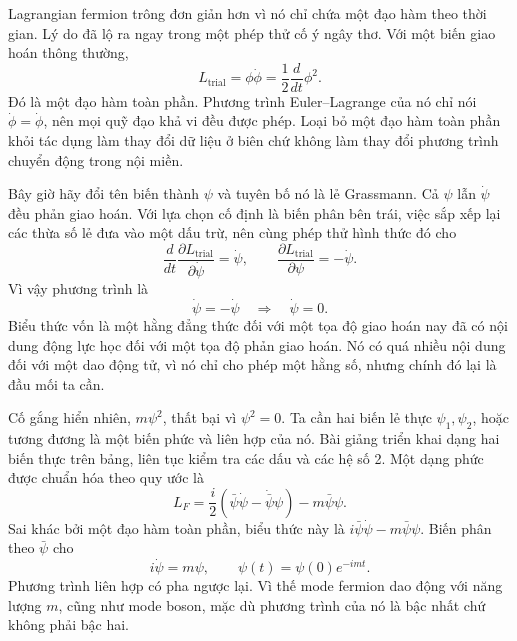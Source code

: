 Lagrangian fermion trông đơn giản hơn vì nó chỉ chứa một đạo hàm theo thời gian. Lý do đã lộ ra ngay trong một phép thử cố ý ngây thơ. Với một biến giao hoán thông thường,
\begin{equation}
L_{\mathrm{trial}}=\phi\dot\phi
=\frac{1}{2}\frac{d}{dt}\phi^2.
\end{equation}
Đó là một đạo hàm toàn phần. Phương trình Euler--Lagrange của nó chỉ nói \(\dot\phi=\dot\phi\), nên mọi quỹ đạo khả vi đều được phép. Loại bỏ một đạo hàm toàn phần khỏi tác dụng làm thay đổi dữ liệu ở biên chứ không làm thay đổi phương trình chuyển động trong nội miền.

Bây giờ hãy đổi tên biến thành \(\psi\) và tuyên bố nó là lẻ Grassmann. Cả \(\psi\) lẫn \(\dot\psi\) đều phản giao hoán. Với lựa chọn cố định là biến phân bên trái, việc sắp xếp lại các thừa số lẻ đưa vào một dấu trừ, nên cùng phép thử hình thức đó cho
\begin{equation}
\frac{d}{dt}\frac{\partial L_{\mathrm{trial}}}{\partial\dot\psi}
=\dot\psi,
\qquad
\frac{\partial L_{\mathrm{trial}}}{\partial\psi}
=-\dot\psi.
\end{equation}
Vì vậy phương trình là
\begin{equation}
\dot\psi=-\dot\psi
\quad\Longrightarrow\quad
\dot\psi=0.
\label{eq:l7-constant-fermion}
\end{equation}
Biểu thức vốn là một hằng đẳng thức đối với một tọa độ giao hoán nay đã có nội dung động lực học đối với một tọa độ phản giao hoán. Nó có quá nhiều nội dung đối với một dao động tử, vì nó chỉ cho phép một hằng số, nhưng chính đó lại là đầu mối ta cần.

\begin{classroomqa}
\end{classroomqa}

Cố gắng hiển nhiên, \(m\psi^2\), thất bại vì \(\psi^2=0\). Ta cần hai biến lẻ thực \(\psi_1,\psi_2\), hoặc tương đương là một biến phức và liên hợp của nó. Bài giảng triển khai dạng hai biến thực trên bảng, liên tục kiểm tra các dấu và các hệ số 2. Một dạng phức được chuẩn hóa theo quy ước là
\begin{equation}
L_F=\frac{i}{2}
\left(\bar\psi\dot\psi-\dot{\bar\psi}\psi\right)
-m\bar\psi\psi.
\label{eq:l7-fermion-lagrangian}
\end{equation}
Sai khác bởi một đạo hàm toàn phần, biểu thức này là \(i\bar\psi\dot\psi-m\bar\psi\psi\). Biến phân theo \(\bar\psi\) cho
\begin{equation}
i\dot\psi=m\psi,
\qquad
\psi(t)=\psi(0)e^{-imt}.
\label{eq:l7-fermion-eom}
\end{equation}
Phương trình liên hợp có pha ngược lại. Vì thế mode fermion dao động với năng lượng \(m\), cũng như mode boson, mặc dù phương trình của nó là bậc nhất chứ không phải bậc hai.

